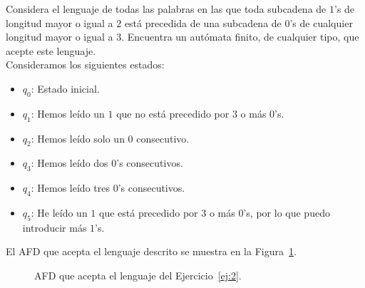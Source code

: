 \documentclass[12pt]{article}
\begin{document}
    \begin{ejercicio} \label{ej:2}
        Considera el lenguaje de todas las palabras en las que toda subcadena de $1$'s de longitud mayor o igual a $2$ está precedida de una subcadena de $0$'s de cualquier longitud mayor o igual a $3$. Encuentra un autómata finito, de cualquier tipo, que acepte este lenguaje.\\

        Consideramos los siguientes estados:
        \begin{itemize}
            \item $q_0$: Estado inicial.
            \item $q_1$: Hemos leído un $1$ que no está precedido por $3$ o más $0$'s.
            \item $q_2$: Hemos leído solo un $0$ consecutivo.
            \item $q_3$: Hemos leído dos $0$'s consecutivos.
            \item $q_4$: Hemos leído tres $0$'s consecutivos.
            \item $q_5$: He leído un $1$ que está precedido por $3$ o más $0$'s, por lo que puedo introducir más $1$'s.
        \end{itemize}

        El AFD que acepta el lenguaje descrito se muestra en la Figura~\ref{fig:ej2_AFD}.
        \begin{figure}[h]
            \centering
            \caption{AFD que acepta el lenguaje del Ejercicio~\ref{ej:2}.}
            \label{fig:ej2_AFD}
        \end{figure}
    \end{ejercicio}
\end{document}
